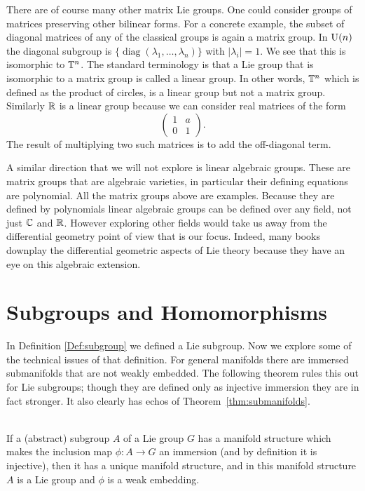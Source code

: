 There are of course many other matrix Lie groups.
One could consider groups of matrices preserving other bilinear forms. 
For a concrete example, the subset of diagonal matrices of any of the classical groups is again a matrix group.
In $\mathrm{U}(n)$ the diagonal subgroup is $\{\operatorname{diag}(\lambda_1,\dots,\lambda_n)\}$ with $|\lambda_i| = 1$.
We see that this is isomorphic to $\mathbb{T}^n$.
The standard terminology is that a Lie group that is isomorphic to a matrix group is called a linear group.
In other words, $\mathbb{T}^n$ which is defined as the product of circles, is a linear group but not a matrix group.
Similarly $\mathbb{R}$ is a linear group because we can consider real matrices of the form
\[
\begin{pmatrix}
1 & a \\
0 & 1
\end{pmatrix}.
\]
The result of multiplying two such matrices is to add the off-diagonal term.

A similar direction that we will not explore is linear algebraic groups.
These are matrix groups that are algebraic varieties, in particular their defining equations are polynomial.
All the matrix groups above are examples.
Because they are defined by polynomials linear algebraic groups can be defined over any field, not just $\mathbb{C}$ and $\mathbb{R}$.
However exploring other fields would take us away from the differential geometry point of view that is our focus.
Indeed, many books downplay the differential geometric aspects of Lie theory because they have an eye on this algebraic extension.






\section{Subgroups and Homomorphisms}
\label{sec:subgroups}
In Definition \ref{Def:subgroup} we defined a Lie subgroup.
Now we explore some of the technical issues of that definition.
For general manifolds there are immersed submanifolds that are not weakly embedded. 
The following theorem rules this out for Lie subgroups; though they are defined only as injective immersion they are in fact stronger.
It also clearly has echos of Theorem~\ref{thm:submanifolds}.

\begin{theorem}
\label{thm:subgroup weakly embedded}
\textup{\cite[3.20]{Warner1983}}\\
If a (abstract) subgroup $A$ of a Lie group $G$ has a manifold structure which makes the inclusion map $\phi: A \to G$ an immersion (and by definition it is injective), then it has a unique manifold structure, and in this manifold structure $A$ is a Lie group and $\phi$ is a weak embedding.
\end{theorem}

